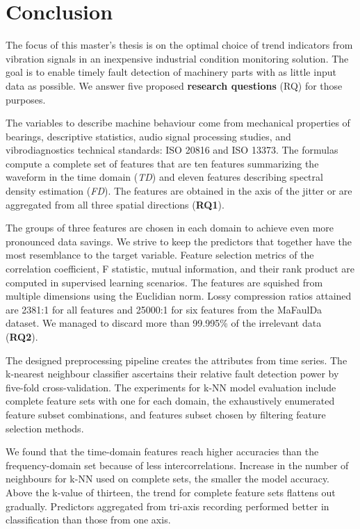 \chapter{Conclusion} \label{section:conclusion}  
The focus of this master's thesis is on the optimal choice of trend indicators from vibration signals in an inexpensive industrial condition monitoring solution. The goal is to enable timely fault detection of machinery parts with as little input data as possible. We answer five proposed \textbf{research questions} (RQ) for those purposes.

The variables to describe machine behaviour come from mechanical properties of bearings, descriptive statistics, audio signal processing studies, and vibrodiagnostics technical standards: ISO 20816 and ISO 13373. The formulas compute a complete set of features that are ten features summarizing the waveform in the time domain (\emph{TD}) and eleven features describing spectral density estimation (\emph{FD}). The features are obtained in the axis of the jitter or are aggregated from all three spatial directions (\textbf{RQ1}).

The groups of three features are chosen in each domain to achieve even more pronounced data savings. We strive to keep the predictors that together have the most resemblance to the target variable. Feature selection metrics of the correlation coefficient, F statistic, mutual information, and their rank product are computed in supervised learning scenarios. The features are squished from multiple dimensions using the Euclidian norm. Lossy compression ratios attained are 2381:1 for all features and 25000:1 for six features from the MaFaulDa dataset. We managed to discard more than 99.995\% of the irrelevant data (\textbf{RQ2}).

The designed preprocessing pipeline creates the attributes from time series. The k-nearest neighbour classifier ascertains their relative fault detection power by five-fold cross-validation. The experiments for k-NN model evaluation include complete feature sets with one for each domain, the exhaustively enumerated feature subset combinations, and features subset chosen by filtering feature selection methods. 

We found that the time-domain features reach higher accuracies than the frequency-domain set because of less intercorrelations. Increase in the number of neighbours for k-NN used on complete sets, the smaller the model accuracy. Above the k-value of thirteen, the trend for complete feature sets flattens out gradually. Predictors aggregated from tri-axis recording performed better in classification than those from one axis. 

